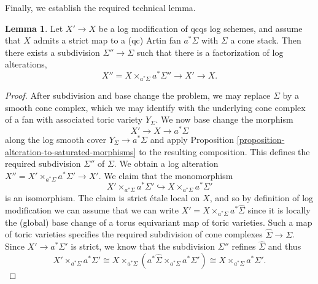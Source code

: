 \documentclass[11pt]{amsart}
\theoremstyle{definition}
\theoremstyle{definition}
\newtheorem{lemma}[theorem]{Lemma}
\begin{document}
Finally, we establish the required technical lemma.
\begin{lemma}\label{lem:SubdivideConeCX}
    Let $X'\rightarrow X$ be a log modification of qcqs log schemes, and assume that $X$ admits a strict map to a (qc) Artin fan $a^\ast \Sigma$ with $\Sigma$ a cone stack.
    Then there exists a subdivision $\Sigma''\rightarrow \Sigma$ such that there is a factorization of log alterations,
    $$X'' = X\times_{a^\ast \Sigma} {a^\ast \Sigma''}\longrightarrow X'\longrightarrow X.$$
\end{lemma}
\begin{proof}
    After subdivision and base change the problem, we may replace $\Sigma$ by a smooth cone complex, which we may identify with the underlying cone complex of a fan with associated toric variety $Y_\Sigma$. We now base change the morphism $$X'\longrightarrow X \longrightarrow a^\ast \Sigma$$ along the log smooth cover $Y_\Sigma\rightarrow a^\ast \Sigma$ and apply Proposition \ref{proposition-alteration-to-saturated-morphisms} to the resulting composition. This defines the required subdivision $\Sigma''$ of $\Sigma$. We obtain a log alteration $X'' = X'\times_{a^\ast \Sigma} a^\ast \Sigma' \rightarrow X'$. We claim that the monomorphism $$X'\times_{a^\ast \Sigma} a^\ast \Sigma'\hookrightarrow X\times_{a^\ast \Sigma} a^\ast \Sigma'$$ is an isomorphism. The claim is strict \'etale local on $X$, and so by definition of log modification we can assume that we can write $X' = X\times_{a^\ast \Sigma} a^\ast \hat{\Sigma}$ since it is locally the (global) base change of a torus equivariant map of toric varieties. Such a map of toric varieties specifies the required subdivision of cone complexes $\hat{\Sigma}\rightarrow \Sigma$. Since $X'\rightarrow a^\ast \Sigma'$ is strict, we know that the subdivision $\Sigma''$ refines $\hat{\Sigma}$ and thus $$X'\times_{a^\ast \Sigma} a^\ast \Sigma'\cong X\times_{a^\ast \Sigma} \left(a^\ast \hat{\Sigma}\times_{a^\ast \Sigma}a^\ast \Sigma'\right)\cong X\times_{a^\ast \Sigma} a^\ast \Sigma'.$$
\end{proof}
\end{document}
